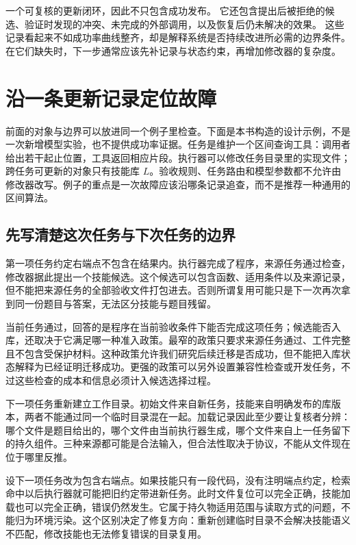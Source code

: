 一个可复核的更新闭环，因此不只包含成功发布。
它还包含提出后被拒绝的候选、验证时发现的冲突、未完成的外部调用，以及恢复后仍未解决的效果。
这些记录看起来不如成功率曲线整齐，却是解释系统是否持续改进所必需的边界条件。
在它们缺失时，下一步通常应该先补记录与状态约束，再增加修改器的复杂度。


\section{沿一条更新记录定位故障}
\label{sec:ch02-walkthrough}

前面的对象与边界可以放进同一个例子里检查。下面是本书构造的设计示例，不是一次新增模型实验，也不提供成功率证据。任务是维护一个区间查询工具：调用者给出若干起止位置，工具返回相应片段。执行器可以修改任务目录里的实现文件；跨任务可更新的对象只有技能库 $L$。验收规则、任务路由和模型参数都不允许由修改器改写。例子的重点是一次故障应该沿哪条记录追查，而不是推荐一种通用的区间算法。

\subsection{先写清楚这次任务与下次任务的边界}

第一项任务约定右端点不包含在结果内。执行器完成了程序，来源任务通过检查，修改器据此提出一个技能候选。这个候选可以包含函数、适用条件以及来源记录，但不能把来源任务的全部验收文件打包进去。否则所谓复用可能只是下一次再次拿到同一份题目与答案，无法区分技能与题目残留。

当前任务通过，回答的是程序在当前验收条件下能否完成这项任务；候选能否入库，还取决于它满足哪一种准入政策。最窄的政策只要求来源任务通过、工件完整且不包含受保护材料。这种政策允许我们研究后续迁移是否成功，但不能把入库状态解释为已经证明迁移成功。更强的政策可以另外设置兼容性检查或开发任务，不过这些检查的成本和信息必须计入候选选择过程。

下一项任务重新建立工作目录。初始文件来自新任务，技能来自明确发布的库版本，两者不能通过同一个临时目录混在一起。加载记录因此至少要让复核者分辨：哪个文件是题目给出的，哪个文件由当前执行器生成，哪个文件来自上一任务留下的持久组件。三种来源都可能是合法输入，但合法性取决于协议，不能从文件现在位于哪里反推。

设下一项任务改为包含右端点。如果技能只有一段代码，没有注明端点约定，检索命中以后执行器就可能把旧约定带进新任务。此时文件复位可以完全正确，技能加载也可以完全正确，错误仍然发生。它属于持久物适用范围与读取方式的问题，不能归为环境污染。这个区别决定了修复方向：重新创建临时目录不会解决技能语义不匹配，修改技能也无法修复错误的目录复用。

